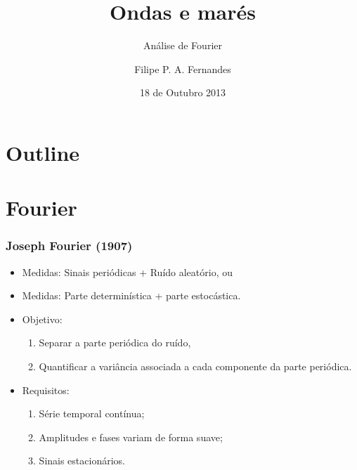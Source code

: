 \title[Aula 06]{Ondas e marés}
\subtitle{Análise de Fourier}
\author[Filipe Fernandes]{Filipe P. A. Fernandes}
\date[Agosto 2013]{18 de Outubro 2013}




\begin{frame}[plain]
  \titlepage
\end{frame}

\section*{Outline}
\begin{frame}
\tableofcontents
\end{frame}

\section{Fourier}
\begin{frame}
\frametitle{Joseph Fourier (1907)}
  \begin{itemize}[<+-| alert@+>]
    \item Medidas: Sinais periódicas + Ruído aleatório, ou
    \item Medidas: Parte determinística + parte estocástica.
    \item Objetivo:
      \begin{enumerate}[<+-| alert@+>]
        \item Separar a parte periódica do ruído,
        \item Quantificar a variância associada a cada componente da parte
              periódica.
      \end{enumerate}
    \item Requisitos:
      \begin{enumerate}[<+-| alert@+>]
        \item Série temporal contínua;
        \item Amplitudes e fases variam de forma suave;
        \item Sinais estacionários.
      \end{enumerate}
  \end{itemize}
\end{frame}


